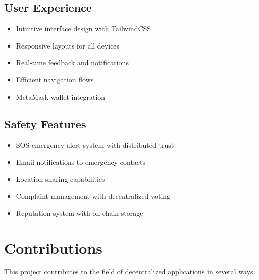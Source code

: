 \documentclass[12pt]{report}
\theoremstyle{plain}
\theoremstyle{definition}
\theoremstyle{remark}
\begin{document}
\subsection{User Experience}

\begin{itemize}
    \item Intuitive interface design with TailwindCSS
    \item Responsive layouts for all devices
    \item Real-time feedback and notifications
    \item Efficient navigation flows
    \item MetaMask wallet integration
\end{itemize}

\subsection{Safety Features}

\begin{itemize}
    \item SOS emergency alert system with distributed trust
    \item Email notifications to emergency contacts
    \item Location sharing capabilities
    \item Complaint management with decentralized voting
    \item Reputation system with on-chain storage
\end{itemize}

\section{Contributions}

This project contributes to the field of decentralized applications in several ways:
\end{document}
